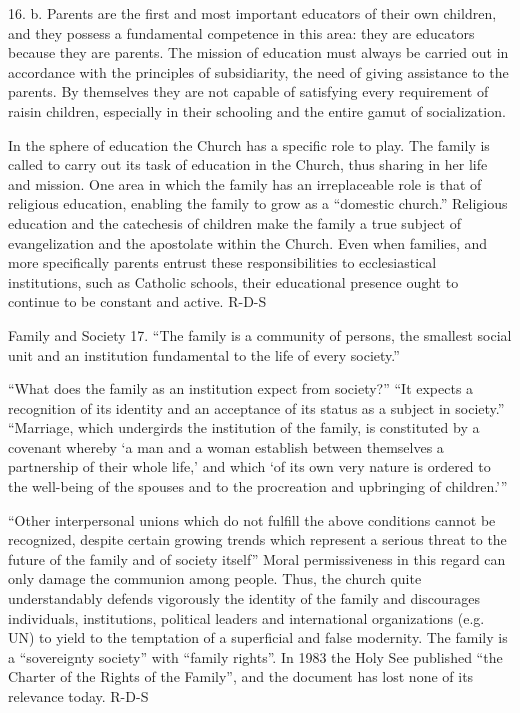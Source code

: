\documentclass[oneside]{book}
\begin{document}
16. b. Parents are the first and most important educators of their own children,
and they possess a fundamental competence in this area: they are educators
because they are parents. The mission of education must always be carried out in
accordance with the principles of subsidiarity, the need of giving assistance to
the parents. By themselves they are not capable of satisfying every requirement
of raisin children, especially in their schooling and the entire gamut of
socialization.

In the sphere of education the Church has a specific role to play. The family is
called to carry out its task of education in the Church, thus sharing in her
life and mission. One area in which the family has an irreplaceable role is that
of religious education, enabling the family to grow as a ``domestic church.''
Religious education and the catechesis of children make the family a true
subject of evangelization and the apostolate within the Church. Even when
families, and more specifically parents entrust these responsibilities to
ecclesiastical institutions, such as Catholic schools, their educational
presence ought to continue to be constant and active.
R-D-S

Family and Society
17. ``The family is a community of persons, the smallest social unit and an
institution fundamental to the life of every society.''

``What does the family as an institution expect from society?'' ``It expects a
recognition of its identity and an acceptance of its status as a subject in
society.'' ``Marriage, which undergirds the institution of the family, is
constituted by a covenant whereby `a man and a woman establish between
themselves a partnership of their whole life,' and which `of its own very nature
is ordered to the well-being of the spouses and to the procreation and
upbringing of children.'''

``Other interpersonal unions which do not fulfill the above conditions cannot be
recognized, despite certain growing trends which represent a serious threat to
the future of the family and of society itself'' Moral permissiveness in this
regard can only damage the communion among people. Thus, the church quite
understandably defends vigorously the identity of the family and discourages
individuals, institutions, political leaders and international organizations
(e.g. UN) to yield to the temptation of a superficial and false modernity. The
family is a ``sovereignty society'' with ``family rights''. In 1983 the Holy See
published ``the Charter of the Rights of the Family'',  and the document has
lost none of its relevance today.
R-D-S
\end{document}
